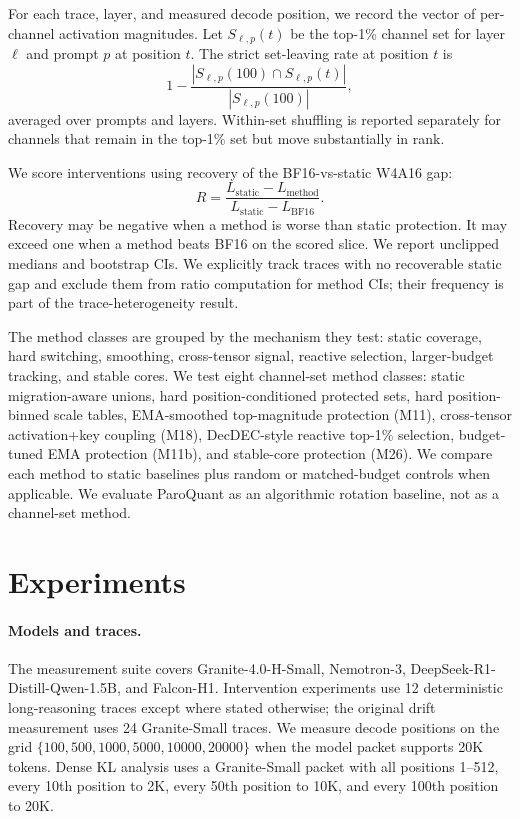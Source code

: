 \documentclass{article}
\begin{document}
For each trace, layer, and measured decode position, we record the vector of per-channel activation magnitudes. Let $S_{\ell,p}(t)$ be the top-1\% channel set for layer $\ell$ and prompt $p$ at position $t$. The strict set-leaving rate at position $t$ is
\begin{equation}
  1 - \frac{|S_{\ell,p}(100) \cap S_{\ell,p}(t)|}{|S_{\ell,p}(100)|},
\end{equation}
averaged over prompts and layers. Within-set shuffling is reported separately for channels that remain in the top-1\% set but move substantially in rank.

We score interventions using recovery of the BF16-vs-static W4A16 gap:
\begin{equation}
  R = \frac{L_{\text{static}} - L_{\text{method}}}{L_{\text{static}} - L_{\text{BF16}}}.
\end{equation}
Recovery may be negative when a method is worse than static protection. It may exceed one when a method beats BF16 on the scored slice. We report unclipped medians and bootstrap CIs. We explicitly track traces with no recoverable static gap and exclude them from ratio computation for method CIs; their frequency is part of the trace-heterogeneity result.

The method classes are grouped by the mechanism they test: static coverage, hard switching, smoothing, cross-tensor signal, reactive selection, larger-budget tracking, and stable cores. We test eight channel-set method classes: static migration-aware unions, hard position-conditioned protected sets, hard position-binned scale tables, EMA-smoothed top-magnitude protection (M11), cross-tensor activation+key coupling (M18), DecDEC-style reactive top-1\% selection, budget-tuned EMA protection (M11b), and stable-core protection (M26). We compare each method to static baselines plus random or matched-budget controls when applicable. We evaluate ParoQuant as an algorithmic rotation baseline, not as a channel-set method.

\section{Experiments}

\paragraph{Models and traces.} The measurement suite covers Granite-4.0-H-Small, Nemotron-3, DeepSeek-R1-Distill-Qwen-1.5B, and Falcon-H1. Intervention experiments use 12 deterministic long-reasoning traces except where stated otherwise; the original drift measurement uses 24 Granite-Small traces. We measure decode positions on the grid $\{100,500,1000,5000,10000,20000\}$ when the model packet supports 20K tokens. Dense KL analysis uses a Granite-Small packet with all positions 1--512, every 10th position to 2K, every 50th position to 10K, and every 100th position to 20K.
\end{document}
